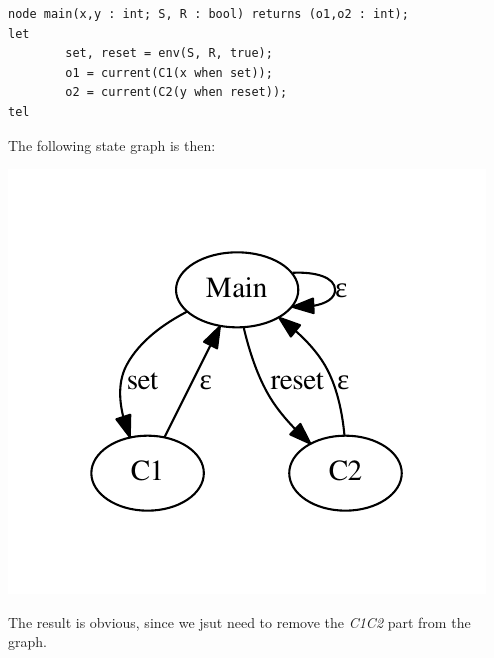 \documentclass{article}
\begin{document}
\begin{verbatim}
node main(x,y : int; S, R : bool) returns (o1,o2 : int);
let
        set, reset = env(S, R, true);
        o1 = current(C1(x when set));
        o2 = current(C2(y when reset));
tel
\end{verbatim}

The following state graph is then:

\begin{center}
\includegraphics{asyn_strict.pdf}
\end{center}

The result is obvious, since we jsut need to remove the \emph{C1C2} part from
the graph.

\end{document}
